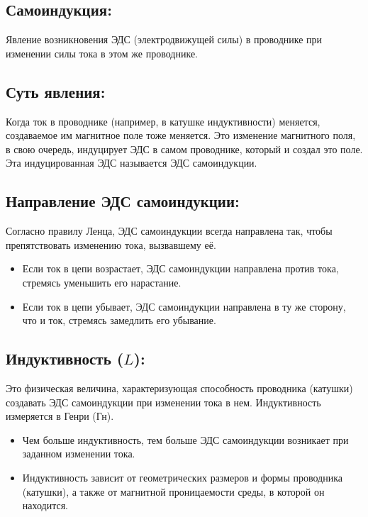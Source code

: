 \documentclass[a4paper,12pt]{article}
\begin{document}
\subsection*{Самоиндукция:}
\vspace{-3pt}
Явление возникновения ЭДС (электродвижущей силы) в проводнике при изменении силы тока в этом же проводнике.

\vspace{-9pt}
\subsection*{Суть явления:}
\vspace{-3pt}
Когда ток в проводнике (например, в катушке индуктивности) меняется, создаваемое им магнитное поле тоже меняется. Это изменение магнитного поля, в свою очередь, индуцирует ЭДС в самом проводнике, который и создал это поле. Эта индуцированная ЭДС называется ЭДС самоиндукции.

\vspace{-9pt}
\subsection*{Направление ЭДС самоиндукции:}
\vspace{-3pt}
Согласно правилу Ленца, ЭДС самоиндукции всегда направлена так, чтобы препятствовать изменению тока, вызвавшему её.
\begin{itemize}
  \item Если ток в цепи возрастает, ЭДС самоиндукции направлена против тока, стремясь уменьшить его нарастание.
  \item Если ток в цепи убывает, ЭДС самоиндукции направлена в ту же сторону, что и ток, стремясь замедлить его убывание.
\end{itemize}

\vspace{-9pt}
\subsection*{Индуктивность ($L$):}
\vspace{-3pt}
Это физическая величина, характеризующая способность проводника (катушки) создавать ЭДС самоиндукции при изменении тока в нем. Индуктивность измеряется в Генри (Гн).
\begin{itemize}
  \item Чем больше индуктивность, тем больше ЭДС самоиндукции возникает при заданном изменении тока.
  \item Индуктивность зависит от геометрических размеров и формы проводника (катушки), а также от магнитной проницаемости среды, в которой он находится.
\end{itemize}
\end{document}
